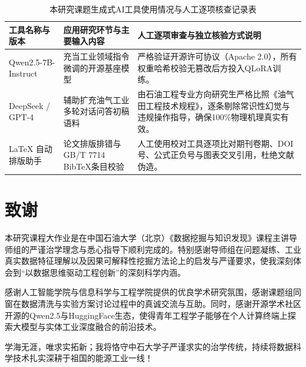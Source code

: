 \documentclass[UTF8,a4paper,zihao=-4,openany,twoside]{ctexbook}
\begin{document}
\begin{table}[htbp]
\centering
\caption{本研究课题生成式AI工具使用情况与人工逐项核查记录表}
\label{tab:app_ai_disclosure}
\begin{tabularx}{\textwidth}{lXX}
\toprule
\textbf{工具名称与版本} & \textbf{应用研究环节与主要输入内容} & \textbf{人工逐项审查与独立核验方式说明} \\
\midrule
Qwen2.5-7B-Instruct & 充当工业领域指令微调的开源基座模型 & 严格验证开源许可协议（Apache 2.0），所有权重哈希校验无篡改后方投入QLoRA训练。 \\
DeepSeek / GPT-4 & 辅助扩充油气工业多轮对话问答初稿语料 & 由石油工程专业方向研究生严格比照《油气田工程技术规程》，逐条剔除常识性幻觉与违规操作指导，确保100\%物理机理真实有效。 \\
LaTeX 自动排版助手 & 论文排版排错与GB/T 7714 BibTeX条目校验 & 人工使用校对工具逐项比对期刊卷期、DOI号、公式正负号与图表交叉引用，杜绝文献伪造。 \\
\bottomrule
\end{tabularx}
\end{table}

\backmatter



\cleardoublepage

\chapter{致谢}
本研究课程大作业是在中国石油大学（北京）《数据挖掘与知识发现》课程主讲导师组的严谨治学理念与悉心指导下顺利完成的。特别感谢导师组在问题凝练、工业真实数据特征理解以及因果可解释性挖掘方法论上的启发与严谨要求，使我深刻体会到“以数据思维驱动工程创新”的深刻科学内涵。

感谢人工智能学院与信息科学与工程学院提供的优良学术研究氛围，感谢课题组同窗在数据清洗与实验方案讨论过程中的真诚交流与互助。同时，感谢开源学术社区开源的Qwen2.5与HuggingFace生态，使得青年工程学子能够在个人计算终端上探索大模型与实体工业深度融合的前沿技术。

学海无涯，唯求实拓新；我将恪守中石大学子严谨求实的治学传统，持续将数据科学技术扎实深耕于祖国的能源工业一线！
\end{document}
